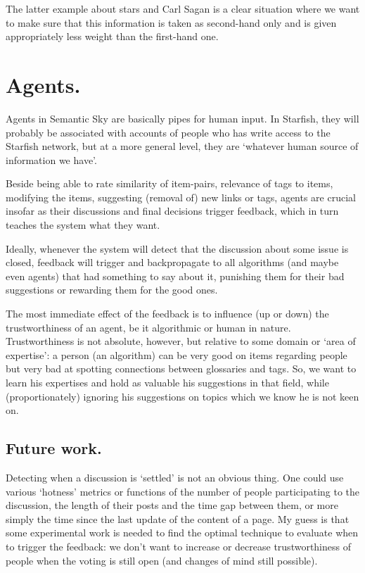 \documentclass[11pt]{article}
\begin{document}
The latter example about stars and Carl Sagan is a clear situation where we want to make sure that this information is taken as second-hand only and is given appropriately less weight than the first-hand one.


\section{Agents.}

Agents in Semantic Sky are basically pipes for human input. In Starfish, they will probably be associated with accounts of people who has write access to the Starfish network, but at a more general level, they are `whatever human source of information we have'.

Beside being able to rate similarity of item-pairs, relevance of tags to items, modifying the items, suggesting (removal of) new links or tags, agents are crucial insofar as their discussions and final decisions trigger feedback, which in turn teaches the system what they want. 

Ideally, whenever the system will detect that the discussion about some issue is closed, feedback will trigger and backpropagate to all algorithms (and maybe even agents) that had something to say about it, punishing them for their bad suggestions or rewarding them for the good ones.

The most immediate effect of the feedback is to influence (up or down) the trustworthiness of an agent, be it algorithmic or human in nature.
Trustworthiness is not absolute, however, but relative to some domain or `area of expertise': a person (an algorithm) can be very good on items regarding people but very bad at spotting connections between glossaries and tags. So, we want to learn his expertises and hold as valuable his suggestions in that field, while (proportionately) ignoring his suggestions on topics which we know he is not keen on.

\subsection{Future work.}

Detecting when a discussion is `settled' is not an obvious thing. One could use various `hotness' metrics or functions of the number of people participating to the discussion, the length of their posts and the time gap between them, or more simply the time since the last update of the content of a page. My guess is that some experimental work is needed to find the optimal technique to evaluate when to trigger the feedback: we don't want to increase or decrease trustworthiness of people when the voting is still open (and changes of mind still possible).
\end{document}
